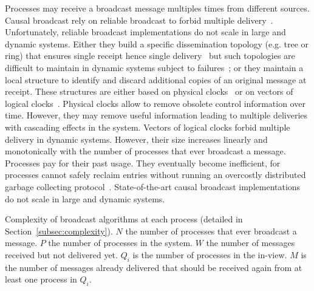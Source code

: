 Processes may receive a broadcast message multiples times from different
sources. Causal broadcast rely on reliable broadcast to forbid multiple
delivery~\cite{hadzilacos1994modular}. Unfortunately, reliable broadcast
implementations do not scale in large and dynamic systems. Either they build a
specific dissemination topology (e.g. tree or ring) that ensures single receipt
hence single delivery~\cite{bravo2017saturn,raynal2013distributed} but such
topologies are difficult to maintain in dynamic systems subject to
failures~\cite{krasikova2016hashtable}; or they maintain a local structure to
identify and discard additional copies of an original message at receipt. These
structures are either based on physical
clocks~\cite{cachin2011introduction,demers1987epidemic} or on vectors of logical
clocks~\cite{malkhi2007concise,mukund2014optimized}. Physical clocks allow to
remove obsolete control information over time. However, they may remove useful
information leading to multiple deliveries with cascading effects in the
system. Vectors of logical clocks forbid multiple delivery in dynamic
systems. However, their size increases linearly and monotonically with the
number of processes that ever broadcast a message. Processes pay for their past
usage. They eventually become inefficient, for processes cannot safely reclaim
entries without running an overcostly distributed garbage collecting
protocol~\cite{abdullahi1998garbage}. State-of-the-art causal broadcast
implementations do not scale in large and dynamic systems.




\begin{table}
  \begin{center}
    \caption{\label{table:complexity} Complexity of broadcast algorithms at each
      process (detailed in Section~\ref{subsec:complexity}). $N$ the number of
      processes that ever broadcast a message. $P$ the number of processes in
      the system. $W$ the number of messages received but not delivered
      yet. $Q_i$ is the number of processes in the in-view. $M$ is the number of
      messages already delivered that should be received again from at least one
      process in $Q_i$.}
  
  \end{center}
\end{table}

